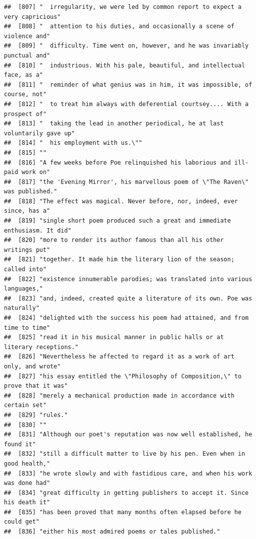 \documentclass{article}\usepackage[]{graphicx}\usepackage[]{color}
\makeatletter
\newenvironment{kframe}{%
 \def\at@end@of@kframe{}%
 \ifinner\ifhmode%
  \def\at@end@of@kframe{\end{minipage}}%
  \begin{minipage}{\columnwidth}%
 \fi\fi%
 \def\FrameCommand##1{\hskip\@totalleftmargin \hskip-\fboxsep
 \colorbox{shadecolor}{##1}\hskip-\fboxsep
     \hskip-\linewidth \hskip-\@totalleftmargin \hskip\columnwidth}%
 \MakeFramed {\advance\hsize-\width
   \@totalleftmargin\z@ \linewidth\hsize
   \@setminipage}}%
 {\par\unskip\endMakeFramed%
 \at@end@of@kframe}
\newenvironment{knitrout}{}{} %
\makeatother
\begin{document}
\begin{knitrout}
\begin{kframe}
\begin{verbatim}
##  [807] "  irregularity, we were led by common report to expect a very capricious"    
##  [808] "  attention to his duties, and occasionally a scene of violence and"         
##  [809] "  difficulty. Time went on, however, and he was invariably punctual and"     
##  [810] "  industrious. With his pale, beautiful, and intellectual face, as a"        
##  [811] "  reminder of what genius was in him, it was impossible, of course, not"     
##  [812] "  to treat him always with deferential courtsey.... With a prospect of"      
##  [813] "  taking the lead in another periodical, he at last voluntarily gave up"     
##  [814] "  his employment with us.\""                                                 
##  [815] ""                                                                            
##  [816] "A few weeks before Poe relinquished his laborious and ill-paid work on"      
##  [817] "the 'Evening Mirror', his marvellous poem of \"The Raven\" was published."   
##  [818] "The effect was magical. Never before, nor, indeed, ever since, has a"        
##  [819] "single short poem produced such a great and immediate enthusiasm. It did"    
##  [820] "more to render its author famous than all his other writings put"            
##  [821] "together. It made him the literary lion of the season; called into"          
##  [822] "existence innumerable parodies; was translated into various languages,"      
##  [823] "and, indeed, created quite a literature of its own. Poe was naturally"       
##  [824] "delighted with the success his poem had attained, and from time to time"     
##  [825] "read it in his musical manner in public halls or at literary receptions."    
##  [826] "Nevertheless he affected to regard it as a work of art only, and wrote"      
##  [827] "his essay entitled the \"Philosophy of Composition,\" to prove that it was"  
##  [828] "merely a mechanical production made in accordance with certain set"          
##  [829] "rules."                                                                      
##  [830] ""                                                                            
##  [831] "Although our poet's reputation was now well established, he found it"        
##  [832] "still a difficult matter to live by his pen. Even when in good health,"      
##  [833] "he wrote slowly and with fastidious care, and when his work was done had"    
##  [834] "great difficulty in getting publishers to accept it. Since his death it"     
##  [835] "has been proved that many months often elapsed before he could get"          
##  [836] "either his most admired poems or tales published."                           

\end{verbatim}
\end{kframe}
\end{knitrout}
\end{document}
